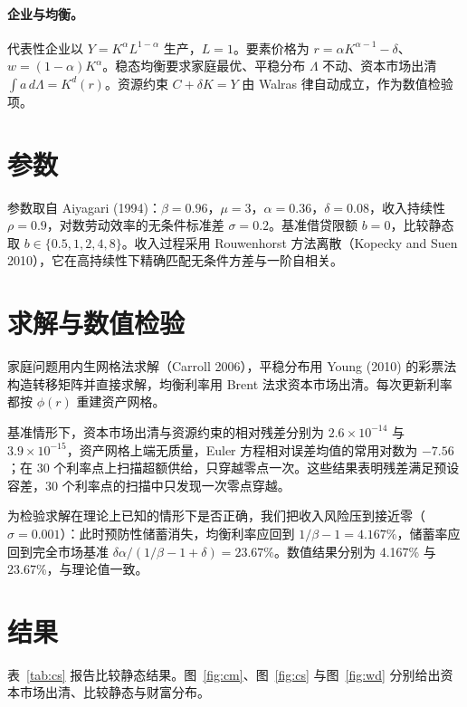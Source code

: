 \documentclass[11pt,a4paper]{ctexart}
\begin{document}
\paragraph{企业与均衡。} 代表性企业以 $Y=K^\alpha L^{1-\alpha}$ 生产，$L=1$。要素价格为 $r=\alpha K^{\alpha-1}-\delta$、$w=(1-\alpha)K^\alpha$。稳态均衡要求家庭最优、平稳分布 $\Lambda$ 不动、资本市场出清 $\int a\,d\Lambda = K^d(r)$。资源约束 $C+\delta K=Y$ 由 Walras 律自动成立，作为数值检验项。

\section{参数}

参数取自 Aiyagari (1994)：$\beta=0.96$，$\mu=3$，$\alpha=0.36$，$\delta=0.08$，收入持续性 $\rho=0.9$，对数劳动效率的无条件标准差 $\sigma=0.2$。基准借贷限额 $b=0$，比较静态取 $b\in\{0.5,1,2,4,8\}$。收入过程采用 Rouwenhorst 方法离散（Kopecky and Suen 2010），它在高持续性下精确匹配无条件方差与一阶自相关。

\section{求解与数值检验}

家庭问题用内生网格法求解（Carroll 2006），平稳分布用 Young (2010) 的彩票法构造转移矩阵并直接求解，均衡利率用 Brent 法求资本市场出清。每次更新利率都按 $\phi(r)$ 重建资产网格。

基准情形下，资本市场出清与资源约束的相对残差分别为 $2.6\times10^{-14}$ 与 $3.9\times10^{-15}$，资产网格上端无质量，Euler 方程相对误差均值的常用对数为 $-7.56$；在 30 个利率点上扫描超额供给，只穿越零点一次。这些结果表明残差满足预设容差，30 个利率点的扫描中只发现一次零点穿越。

为检验求解在理论上已知的情形下是否正确，我们把收入风险压到接近零（$\sigma=0.001$）：此时预防性储蓄消失，均衡利率应回到 $1/\beta-1=4.167\%$，储蓄率应回到完全市场基准 $\delta\alpha/(1/\beta-1+\delta)=23.67\%$。数值结果分别为 4.167\% 与 23.67\%，与理论值一致。

\section{结果}

表~\ref{tab:cs} 报告比较静态结果。图~\ref{fig:cm}、图~\ref{fig:cs} 与图~\ref{fig:wd} 分别给出资本市场出清、比较静态与财富分布。

\begin{table}[h]
\centering
\caption{借贷限额的比较静态。$b$ 为借贷限额，$b/w$ 为以年工资计的借贷额度，$r$ 为均衡年利率，$K/Y$ 为资本产出比，$s=\delta K/Y$ 为储蓄率，受约束比例为下期资产处于借贷下限的家庭占比，财富 Gini 系数按净资产（含负资产）计算}\label{tab:cs}

\end{table}
\end{document}
